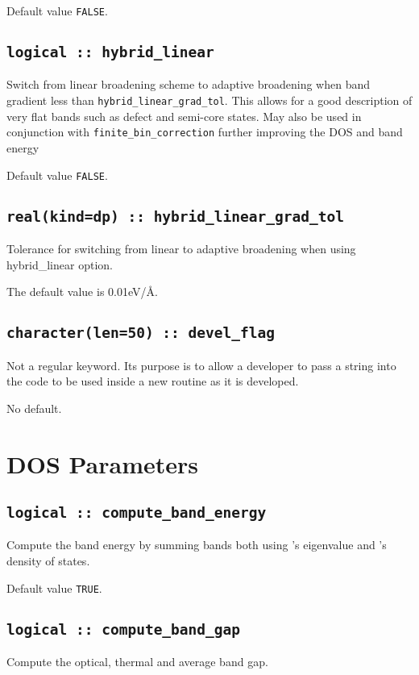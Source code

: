 \documentclass[a4paper,11pt,twoside]{book}
\begin{document}
{Default value \verb#FALSE#.

\subsection[hybrid\_linear]{\tt logical :: hybrid\_linear}
Switch from linear broadening scheme to adaptive broadening when band gradient less than \verb#hybrid_linear_grad_tol#.
This allows for a good description of very flat bands such as defect and semi-core states. May also be used in conjunction
with \verb#finite_bin_correction# further improving the DOS and band energy

Default value \verb#FALSE#.

\subsection[hybrid\_linear\_grad\_tol]{\tt real(kind=dp) :: hybrid\_linear\_grad\_tol}
Tolerance for switching from linear to adaptive broadening when using hybrid\_linear option.

The default value is 0.01eV/\AA.


\subsection[devel\_flag]{\tt character(len=50) :: devel\_flag}

Not a regular keyword. Its purpose is to allow a developer to pass a
string into the code to be used inside a new routine as it is developed.

No default.



\section{DOS Parameters}

\subsection[compute\_band\_energy]{\tt logical :: compute\_band\_energy}
Compute the band energy by summing bands both using \castep's eigenvalue and \optados's density of states.

Default value \verb#TRUE#.

\subsection[compute\_band\_energy]{\tt logical :: compute\_band\_gap}
Compute the optical, thermal and average band gap.

}
\end{document}
